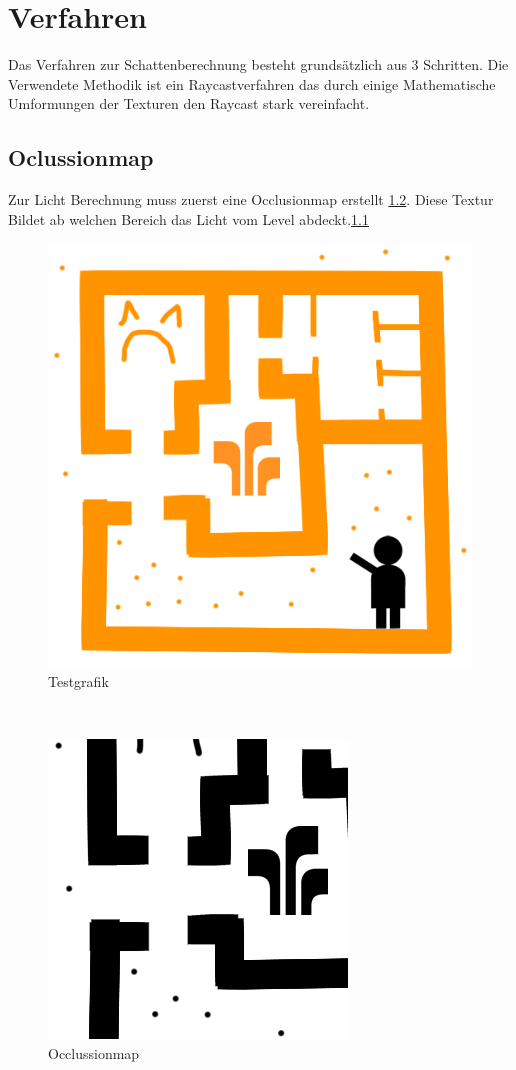 \chapter{Verfahren}
Das Verfahren zur Schattenberechnung besteht grundsätzlich aus 3 Schritten.
Die Verwendete Methodik ist ein Raycastverfahren das durch einige Mathematische Umformungen der Texturen den Raycast stark vereinfacht.
\section{Oclussionmap}
Zur Licht Berechnung muss zuerst eine Occlusionmap erstellt \ref{o_1}. Diese Textur Bildet ab welchen Bereich das Licht vom Level abdeckt.\ref{level_1}
\begin{figure}
	\centering
	\includegraphics[scale=0.5]{images/test.png}
	\caption{Testgrafik}
	\label{level_1}
\end{figure}
\\
\begin{figure}
	\centering
	\includegraphics{images/oclusion.png}
	\caption{Occlussionmap}
	\label{o_1}
\end{figure}
\\

